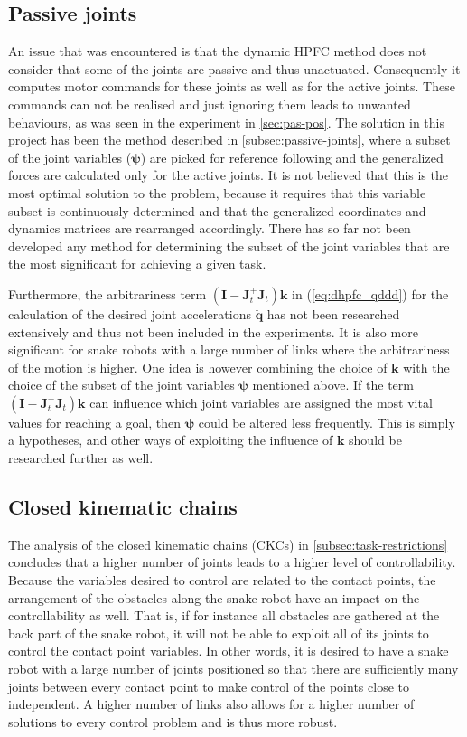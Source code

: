 \subsection{Passive joints}\label{subsec:dis-passive-joints}

An issue that was encountered is that the dynamic HPFC method does not consider that some of the joints are passive and thus unactuated. Consequently it computes motor commands for these joints as well as for the active joints. These commands can not be realised and just ignoring them leads to unwanted behaviours, as was seen in the experiment in \ref{sec:pas-pos}. The solution in this project has been the method described in \ref{subsec:passive-joints}, where a subset of the joint variables ($\boldsymbol{\psi}$) are picked for reference following and the generalized forces are calculated only for the active joints. It is not believed that this is the most optimal solution to the problem, because it requires that this variable subset is continuously determined and that the generalized coordinates and dynamics matrices are rearranged accordingly. There has so far not been developed any method for determining the subset of the joint variables that are the most significant for achieving a given task.

Furthermore, the arbitrariness term $(\mathbf{I}-  \mathbf{J}_t^+ \mathbf{J}_t)\mathbf{k}$ in (\ref{eq:dhpfc_qddd}) for the calculation of the desired joint accelerations $\ddot{\mathbf{q}}$ has not been researched extensively and thus not been included in the experiments. It is also more significant for snake robots with a large number of links where the arbitrariness of the motion is higher. One idea is however combining the choice of $\mathbf{k}$ with the choice of the subset of the joint variables $\boldsymbol{\psi}$ mentioned above. If the term $(\mathbf{I}-  \mathbf{J}_t^+ \mathbf{J}_t)\mathbf{k}$ can influence which joint variables are assigned the most vital values for reaching a goal, then $\boldsymbol{\psi}$ could be altered less frequently. This is simply a hypotheses, and other ways of exploiting the influence of $\mathbf{k}$ should be researched further as well.

\subsection{Closed kinematic chains}

The analysis of the closed kinematic chains (CKCs) in \ref{subsec:task-restrictions} concludes that a higher number of joints leads to a higher level of controllability. Because the variables desired to control are related to the contact points, the arrangement of the obstacles along the snake robot have an impact on the controllability as well. That is, if for instance all obstacles are gathered at the back part of the snake robot, it will not be able to exploit all of its joints to control the contact point variables. In other words, it is desired to have a snake robot with a large number of joints positioned so that there are sufficiently many joints between every contact point to make control of the points close to independent. A higher number of links also allows for a higher number of solutions to every control problem and is thus more robust.

